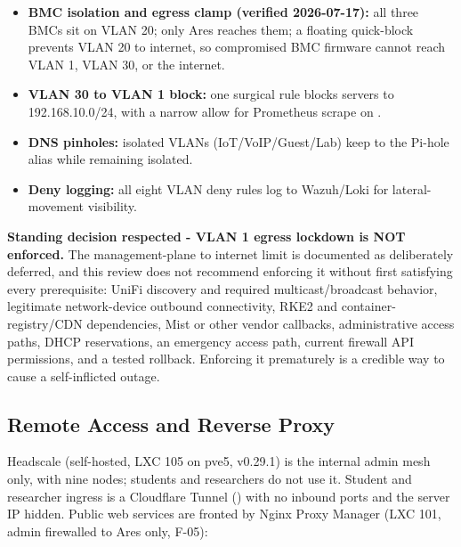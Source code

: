 \begin{itemize}
\item \textbf{BMC isolation and egress clamp (verified 2026-07-17):} all three BMCs sit
on VLAN 20; only Ares reaches them; a floating quick-block prevents VLAN 20 to internet,
so compromised BMC firmware cannot reach VLAN 1, VLAN 30, or the internet.
\item \textbf{VLAN 30 to VLAN 1 block:} one surgical rule blocks servers to
192.168.10.0/24, with a narrow allow for Prometheus scrape on .
\item \textbf{DNS pinholes:} isolated VLANs (IoT/VoIP/Guest/Lab) keep  to the
Pi-hole alias while remaining isolated.
\item \textbf{Deny logging:} all eight VLAN deny rules log to Wazuh/Loki for
lateral-movement visibility.
\end{itemize}

\begin{callout}
\textbf{Standing decision respected - VLAN 1 egress lockdown is NOT enforced.} The
management-plane to internet limit is documented as deliberately deferred, and this
review does not recommend enforcing it without first satisfying every prerequisite:
UniFi discovery and required multicast/broadcast behavior, legitimate network-device
outbound connectivity, RKE2 and container-registry/CDN dependencies, Mist or other
vendor callbacks, administrative access paths, DHCP reservations, an emergency access
path, current firewall API permissions, and a tested rollback. Enforcing it prematurely
is a credible way to cause a self-inflicted outage.
\end{callout}

\subsection{Remote Access and Reverse Proxy}

Headscale (self-hosted, LXC 105 on pve5, v0.29.1) is the internal admin mesh only, with
nine nodes; students and researchers do not use it. Student and researcher ingress is a
Cloudflare Tunnel () with no inbound ports and the server
IP hidden. Public web services are fronted by Nginx Proxy Manager (LXC 101, admin
 firewalled to Ares only, F-05):

